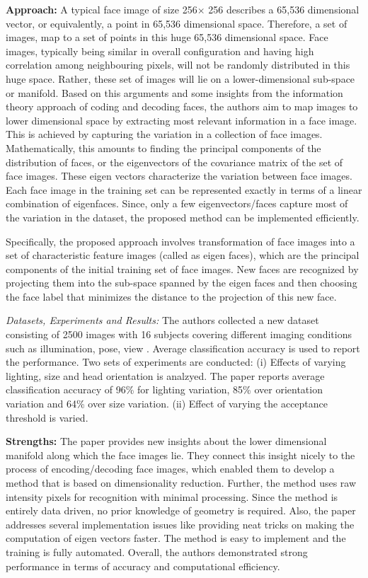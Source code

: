 \documentclass[10pt,twocolumn,letterpaper]{article}
\begin{document}
\noindent\textbf{Approach:} A typical face image of size 256$\times$ 256 describes a 65,536 dimensional vector, or equivalently, a point in 65,536 dimensional space. Therefore, a set of images, map to a set of points in this huge 65,536 dimensional space. Face images, typically being similar in overall configuration and having high correlation among neighbouring pixels, will not be randomly distributed in this huge space. Rather, these set of images will lie on a lower-dimensional sub-space or manifold. Based on this arguments and some insights from the information theory approach of coding and decoding faces, the authors aim to map images to lower dimensional space by extracting most relevant information in a face image. This is achieved by capturing the variation in a collection of face images. Mathematically, this amounts to finding the principal components of the distribution of faces, or the eigenvectors  of the covariance matrix of  the set of face images.  These eigen vectors characterize the variation between face images. Each face image in the training set can be represented exactly in terms of a linear combination of eigenfaces. Since, only a few eigenvectors/faces capture most of the variation in the dataset, the proposed method can be implemented efficiently.  

Specifically, the proposed approach involves transformation of face images into a set of characteristic feature images (called as eigen faces), which are the principal components of the initial training set of face images. New faces are recognized by projecting them into the sub-space spanned by the eigen faces and then choosing the face label that minimizes the distance to the projection of this new face. 

\noindent\textit{Datasets, Experiments and Results:} The authors collected a new dataset consisting of 2500 images with 16 subjects covering different imaging conditions such as illumination, pose, view \etc.   Average classification accuracy is used to report the performance. Two sets of experiments are conducted: (i) Effects of varying lighting, size and head orientation is analzyed. The paper reports average classification accuracy of 96\% for lighting variation, 85\% over orientation variation and 64\% over size variation.  (ii) Effect of varying the acceptance threshold is varied. 

\noindent\textbf{Strengths:} The paper provides new insights about the lower dimensional manifold along which the face images lie. They connect this insight nicely to the process of encoding/decoding face images,  which enabled them to develop a method that is based on dimensionality reduction. Further, the method uses raw intensity pixels for recognition with minimal processing. Since the method is entirely data driven, no prior knowledge of geometry is required.  Also, the paper addresses several implementation issues like providing neat tricks on making the computation of eigen vectors faster. The method is easy to implement and the training is fully automated. Overall, the authors demonstrated strong performance in terms of accuracy and computational efficiency. %
\end{document}
